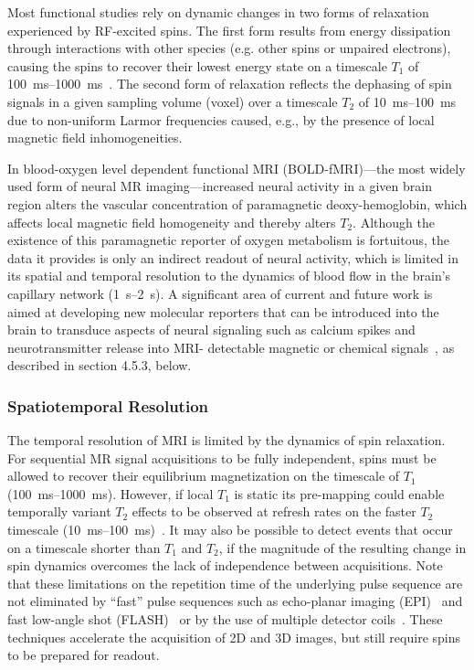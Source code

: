 Most functional studies rely on dynamic changes in two forms of relaxation experienced by RF-excited spins.
The first form results from energy dissipation through interactions with other species (e.g. other spins or unpaired electrons), causing the spins to recover their lowest energy state on a timescale $T_1$ of \SIrange{100}{1000}{\milli\second}~\cite{rooney07}.
The second form of relaxation reflects the dephasing of spin signals in a given sampling volume (voxel) over a timescale $T_2$ of \SIrange{10}{100}{\milli\second}~\cite{deichmann95} due to non-uniform Larmor frequencies caused, e.g., by the presence of local magnetic field inhomogeneities.

In blood-oxygen level dependent functional MRI (BOLD-fMRI)---the most widely used form of neural MR imaging---increased neural activity in a given brain region alters the vascular concentration of paramagnetic deoxy-hemoglobin, which affects local magnetic field homogeneity and thereby alters $T_2$.
Although the existence of this paramagnetic reporter of oxygen metabolism is fortuitous, the data it provides is only an indirect readout of neural activity, which is limited in its spatial and temporal resolution to the dynamics of blood flow in the brain's capillary network (\SIrange{1}{2}{\second}).
A significant area of current and future work is aimed at developing new molecular reporters that can be introduced into the brain to transduce aspects of neural signaling such as calcium spikes and neurotransmitter release into MRI- detectable magnetic or chemical signals~\cite{shapiro10,koretsky12,hsieh12}, as described in section 4.5.3, below.

\subsubsection{Spatiotemporal Resolution}

The temporal resolution of MRI is limited by the dynamics of spin relaxation. For sequential MR signal acquisitions to be fully independent, spins must be allowed to recover their equilibrium magnetization on the timescale of $T_1$ (\SIrange{100}{1000}{\milli\second}).
However, if local $T_1$ is static its pre-mapping could enable temporally variant $T_2$ effects to be observed at refresh rates on the faster $T_2$ timescale (\SIrange{10}{100}{\milli\second})~\cite{deichmann95}.
It may also be possible to detect events that occur on a timescale shorter than $T_1$ and $T_2$, if the magnitude of the resulting change in spin dynamics overcomes the lack of independence between acquisitions.
Note that these limitations on the repetition time of the underlying pulse sequence are not eliminated by ``fast'' pulse sequences such as echo-planar imaging (EPI)~\cite{stehling91} and fast low-angle shot (FLASH)~\cite{haase86} or by the use of multiple detector coils~\cite{wiesinger06}.
These techniques accelerate the acquisition of 2D and 3D images, but still require spins to be prepared for readout.

